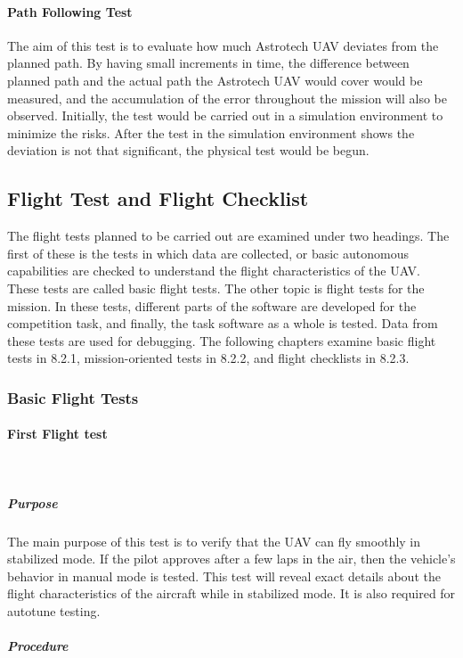 \documentclass[12pt]{article}
\begin{document}
\paragraph*{Path Following Test} The aim of this test is to evaluate how much Astrotech UAV deviates from the planned path. By having small increments in time, the difference between planned path and the actual path the Astrotech UAV would cover would be measured, and the accumulation of the error throughout the mission will also be observed. Initially, the test would be carried out in a simulation environment to minimize the risks. After the test in the simulation environment shows the deviation is not that significant, the physical test would be begun.


\subsection{Flight Test and Flight Checklist}
The flight tests planned to be carried out are examined under two headings. The first of these is the tests in which data are collected, or basic autonomous capabilities are checked to understand the flight characteristics of the UAV. These tests are called basic flight tests. The other topic is flight tests for the mission. In these tests, different parts of the software are developed for the competition task, and finally, the task software as a whole is tested. Data from these tests are used for debugging. The following chapters examine basic flight tests in 8.2.1, mission-oriented tests in 8.2.2, and flight checklists in 8.2.3.

\subsubsection*{Basic Flight Tests}

\paragraph*{First Flight test}\\

\subparagraph*{Purpose} The main purpose of this test is to verify that the UAV can fly smoothly in stabilized mode. If the pilot approves after a few laps in the air, then the vehicle's behavior in manual mode is tested. This test will reveal exact details about the flight characteristics of the aircraft while in stabilized mode. It is also required for autotune testing.

\subparagraph*{Procedure}
\end{document}
